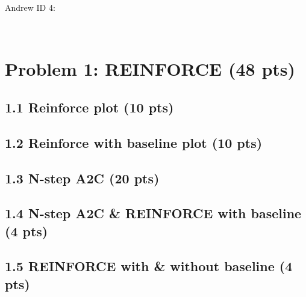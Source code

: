 \documentclass[12pt]{article}
\begin{document}
Andrew ID 4: \begin{tcolorbox}[fit,height=1cm, width=5cm, blank, borderline={1pt}{1pt},nobeforeafter]
    \begin{center}
    \vspace{3mm}
    \large{}
    \end{center}
\end{tcolorbox} \\
\vspace{0.5cm}
\vspace{0.5cm}


\newpage
\section*{Problem 1: REINFORCE (48 pts)}

\subsection*{1.1 Reinforce plot (10 pts)}
\begin{solution}[height=9cm]
\end{solution}

\subsection*{1.2 Reinforce with baseline plot (10 pts)}
\begin{solution}[height=9cm]
\end{solution}

\subsection*{1.3 N-step A2C (20 pts)}
\begin{solution}[height=20cm]
\end{solution}

\subsection*{1.4 N-step A2C \& REINFORCE with baseline (4 pts)}
\begin{solution}[height=5cm]
\end{solution}

\subsection*{1.5 REINFORCE with \& without baseline (4 pts)}
\begin{solution}[height=5cm]
\end{solution}
\end{document}
